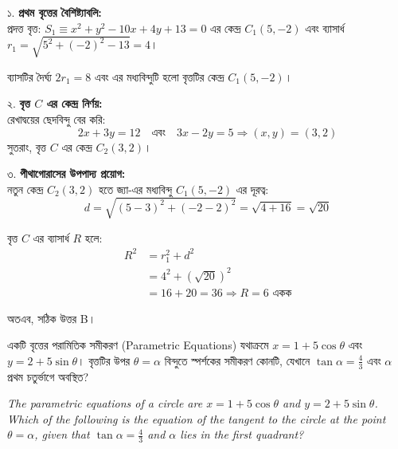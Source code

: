 \documentclass[12pt, a4paper]{article}
\begin{document}
\begin{tcolorbox}[solutionbox={সমাধান (Solution)}]
    \noindent
    ১. \textbf{প্রথম বৃত্তের বৈশিষ্ট্যাবলি:} \\
    প্রদত্ত বৃত্ত: $S_1 \equiv x^2 + y^2 - 10x + 4y + 13 = 0$ 
    এর কেন্দ্র $C_1(5, -2)$ এবং ব্যাসার্ধ $r_1 = \sqrt{5^2 + (-2)^2 - 13} = 4$। 
    
    \vspace{0.5em}
    ব্যাসটির দৈর্ঘ্য $2r_1 = 8$ এবং এর মধ্যবিন্দুটি হলো বৃত্তটির কেন্দ্র $C_1(5, -2)$।
    
    \vspace{0.5em}
    ২. \textbf{বৃত্ত $C$ এর কেন্দ্র নির্ণয়:} \\
    রেখাদ্বয়ের ছেদবিন্দু বের করি: 
    \[ 2x + 3y = 12 \quad \text{এবং} \quad 3x - 2y = 5 \Rightarrow (x, y) = (3, 2) \]
    সুতরাং, বৃত্ত $C$ এর কেন্দ্র $C_2(3, 2)$।
    
    \vspace{0.5em}
    ৩. \textbf{পীথাগোরাসের উপপাদ্য প্রয়োগ:} \\
    নতুন কেন্দ্র $C_2(3, 2)$ হতে জ্যা-এর মধ্যবিন্দু $C_1(5, -2)$ এর দূরত্ব: 
    \[ d = \sqrt{(5-3)^2 + (-2-2)^2} = \sqrt{4 + 16} = \sqrt{20} \]
    
    \vspace{0.5em}
    বৃত্ত $C$ এর ব্যাসার্ধ $R$ হলে: 
    \begin{align*}
        R^2 &= r_1^2 + d^2 \\
        &= 4^2 + (\sqrt{20})^2 \\
        &= 16 + 20 = 36 \Rightarrow R = 6 \text{ একক}
    \end{align*}
    
    \vspace{0.5em}
    অতএব, সঠিক উত্তর B।
\end{tcolorbox}
\begin{tcolorbox}[questionbox={প্রশ্ন (Question) 21}]
    \noindent
    একটি বৃত্তের পরামিতিক সমীকরণ (Parametric Equations) যথাক্রমে $x = 1 + 5\cos\theta$ এবং $y = 2 + 5\sin\theta$। বৃত্তটির উপর $\theta = \alpha$ বিন্দুতে স্পর্শকের সমীকরণ কোনটি, যেখানে $\tan\alpha = \frac{4}{3}$ এবং $\alpha$ প্রথম চতুর্ভাগে অবস্থিত?
    
    \vspace{0.8em}
    \begin{english}
    \noindent\textit{\color{darkgray}
    The parametric equations of a circle are $x = 1 + 5\cos\theta$ and $y = 2 + 5\sin\theta$. Which of the following is the equation of the tangent to the circle at the point $\theta = \alpha$, given that $\tan\alpha = \frac{4}{3}$ and $\alpha$ lies in the first quadrant?
    }
    \end{english}
\end{tcolorbox}
\end{document}
